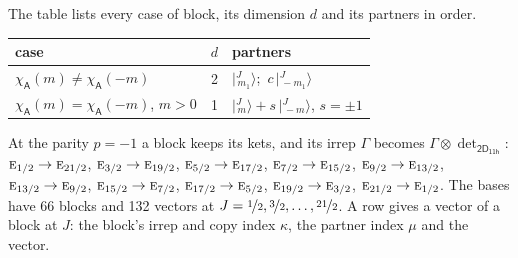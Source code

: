 \documentclass[10pt,a4paper]{article}
\numberwithin{equation}{section}
\newcommand{\grp}[1]{\mathsf{#1}}
\newcommand{\irr}[1]{\text{\normalfont\scshape #1}}
\newcommand{\chiA}{\chi_{\grp{A}}}
\newcommand{\irrprod}{\otimes}
\newcommand{\mult}{\kappa}
\newcommand{\intx}{\mu}
\newcommand{\jm}[2]{\bigl\lvert{}^{#1}_{\,#2}\bigr\rangle}
\begin{document}
\leavevmode\label{n:head.case}\label{n:head.partners}The table lists every case of block, its dimension $d$ and its partners in order.
\begin{center}\begin{tabular}{@{}lrl@{}}\toprule
case & $d$ & partners\\\midrule
$\chiA(m) \ne \chiA(-m)$ & 2 & $\jm{J}{m_1}$;\ $c\,\jm{J}{-m_1}$\\
$\chiA(m) = \chiA(-m)$, $m > 0$ & 1 & $\jm{J}{m} + s\,\jm{J}{-m}$, $s = \pm1$\\
\bottomrule\end{tabular}\end{center}
At the parity $p = -1$ a block keeps its kets, and its irrep $\Gamma$ becomes $\Gamma \irrprod \det_{\grp{2D_{11h}}}$: $\irr{e}_{1/2} \to \irr{e}_{21/2}$, $\irr{e}_{3/2} \to \irr{e}_{19/2}$, $\irr{e}_{5/2} \to \irr{e}_{17/2}$, $\irr{e}_{7/2} \to \irr{e}_{15/2}$, $\irr{e}_{9/2} \to \irr{e}_{13/2}$, $\irr{e}_{13/2} \to \irr{e}_{9/2}$, $\irr{e}_{15/2} \to \irr{e}_{7/2}$, $\irr{e}_{17/2} \to \irr{e}_{5/2}$, $\irr{e}_{19/2} \to \irr{e}_{3/2}$, $\irr{e}_{21/2} \to \irr{e}_{1/2}$.
The bases have 66 blocks and 132 vectors at $J = \nicefrac{1}{2}, \nicefrac{3}{2}, \dots, \nicefrac{21}{2}$. \label{n:head.vector}A row gives a vector of a block at $J$: the block's irrep and copy index $\mult$, the partner index $\intx$ and the vector.
\end{document}
